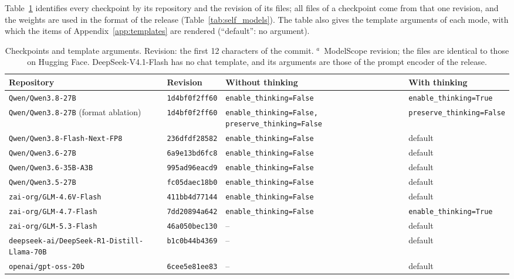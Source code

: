 Table~\ref{tab:self_config} identifies every checkpoint by its repository and the revision of its files; all files of a checkpoint come from that one revision, and the weights are used in the format of the release (Table~\ref{tab:self_models}). The table also gives the template arguments of each mode, with which the items of Appendix~\ref{app:templates} are rendered (``default'': no argument).

\begin{table}[htbp]
\centering
\caption{Checkpoints and template arguments. Revision: the first 12 characters of the commit. $^{a}$~ModelScope revision; the files are identical to those on Hugging Face. DeepSeek-V4.1-Flash has no chat template, and its arguments are those of the prompt encoder of the release.}
\label{tab:self_config}
\scriptsize
\setlength{\tabcolsep}{2.5pt}
\begin{tabular}{llp{3.2cm}p{3.5cm}}
\toprule
Repository & Revision & Without thinking & With thinking \\
\midrule
\texttt{Qwen/Qwen3.8-27B} & \texttt{1d4bf0f2ff60} & \texttt{enable\_thinking=False} & \texttt{enable\_thinking=True} \\
\texttt{Qwen/Qwen3.8-27B} (format ablation) & \texttt{1d4bf0f2ff60} & \texttt{enable\_thinking=\allowbreak False, preserve\_thinking=\allowbreak False} & \texttt{preserve\_thinking=False} \\
\texttt{Qwen/Qwen3.8-Flash-Next-FP8} & \texttt{236dfdf28582} & \texttt{enable\_thinking=False} & default \\
\texttt{Qwen/Qwen3.6-27B} & \texttt{6a9e13bd6fc8} & \texttt{enable\_thinking=False} & default \\
\texttt{Qwen/Qwen3.6-35B-A3B} & \texttt{995ad96eacd9} & \texttt{enable\_thinking=False} & default \\
\texttt{Qwen/Qwen3.5-27B} & \texttt{fc05daec18b0} & \texttt{enable\_thinking=False} & default \\
\texttt{zai-org/GLM-4.6V-Flash} & \texttt{411bb4d77144} & \texttt{enable\_thinking=False} & default \\
\texttt{zai-org/GLM-4.7-Flash} & \texttt{7dd20894a642} & \texttt{enable\_thinking=False} & \texttt{enable\_thinking=True} \\
\texttt{zai-org/GLM-5.3-Flash} & \texttt{46a050bec130} & -- & default \\
\texttt{deepseek-ai/DeepSeek-R1-Distill-Llama-70B} & \texttt{b1c0b44b4369} & -- & default \\
\texttt{openai/gpt-oss-20b} & \texttt{6cee5e81ee83} & -- & default \\

\end{tabular}
\end{table}
